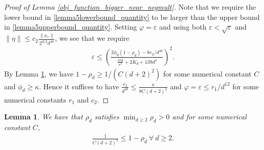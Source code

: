\documentclass[11pt]{article}
\renewcommand{\epsilon}{\varepsilon}
\newtheorem{lem}{Lemma}
\theoremstyle{remark}
\begin{document}
\begin{proof}[Proof of Lemma \ref{obj_function_bigger_near_negmult}]
Note that we require the lower bound in \eqref{lemma5lowerbound_quantity} to be larger than the upper bound in \eqref{lemma5upperbound_quantity}. Setting $\varphi = \epsilon$ and using both $\epsilon < \sqrt{\epsilon}$ and $\|\eta\| \leqslant c_2\frac{\|x_*\|}{2^{d/2}d^{48}}$, we see that we require %
\begin{align}
    \epsilon \leqslant \left(\frac{2\phi_d(1-\rho_d) - 8c_2/d^{48}}{\frac{45d}{\kappa^3} + 2\tilde{K}_d + 139d^4}\right)^2. \label{boundonepsilontogetfunctionbound}
\end{align} By Lemma \ref{bounds_on_rho_lemma}, we have  $1-\rho_d \geqslant 1/(C(d+2)^2)$ for some numerical constant $C$ and $\phi_d \geqslant \kappa$. Hence it suffices to have $\frac{c_2}{d^{48}} \leqslant \frac{\kappa}{8C(d+2)^2}$  and $\varphi = \epsilon \leqslant r_1/d^{12}$ for some numerical constants $r_1$ and $c_2$. %
\end{proof}

\begin{lem} \label{bounds_on_rho_lemma}
We have that $\rho_d$ satisfies $\min_{d \geqslant 2} \rho_d > 0$ and for some numerical constant $C$, \begin{align*}
    \frac{1}{C(d+2)^2} \leqslant 1-\rho_d\ \forall\ d \geqslant 2.
\end{align*}
\end{lem}
\end{document}

